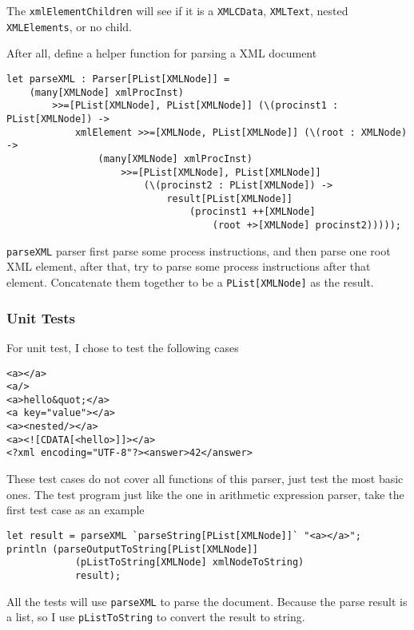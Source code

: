 The \texttt{xmlElementChildren} will see if it is a \texttt{XMLCData}, \texttt{XMLText}, nested \texttt{XMLElements}, or no child.

After all, define a helper function for parsing a XML document

\begin{lstlisting}
let parseXML : Parser[PList[XMLNode]] =
    (many[XMLNode] xmlProcInst)
        >>=[PList[XMLNode], PList[XMLNode]] (\(procinst1 : PList[XMLNode]) ->
            xmlElement >>=[XMLNode, PList[XMLNode]] (\(root : XMLNode) ->
                (many[XMLNode] xmlProcInst)
                    >>=[PList[XMLNode], PList[XMLNode]]
                        (\(procinst2 : PList[XMLNode]) ->
                            result[PList[XMLNode]]
                                (procinst1 ++[XMLNode]
                                    (root +>[XMLNode] procinst2)))));
\end{lstlisting}

\texttt{parseXML} parser first parse some process instructions, and then parse one root XML element, after that, try to parse some process instructions after that element. Concatenate them together to be a \texttt{PList[XMLNode]} as the result.

\subsubsection{Unit Tests}

For unit test, I chose to test the following cases

\begin{lstlisting}[language={}]
<a></a>
<a/>
<a>hello&quot;</a>
<a key="value"></a>
<a><nested/></a>
<a><![CDATA[<hello>]]></a>
<?xml encoding="UTF-8"?><answer>42</answer>
\end{lstlisting}

These test cases do not cover all functions of this parser, just test the most basic ones. The test program just like the one in arithmetic expression parser, take the first test case as an example

\begin{lstlisting}
let result = parseXML `parseString[PList[XMLNode]]` "<a></a>";
println (parseOutputToString[PList[XMLNode]]
            (pListToString[XMLNode] xmlNodeToString)
            result);
\end{lstlisting}

All the tests will use \texttt{parseXML} to parse the document. Because the parse result is a list, so I use \texttt{pListToString} to convert the result to string.

